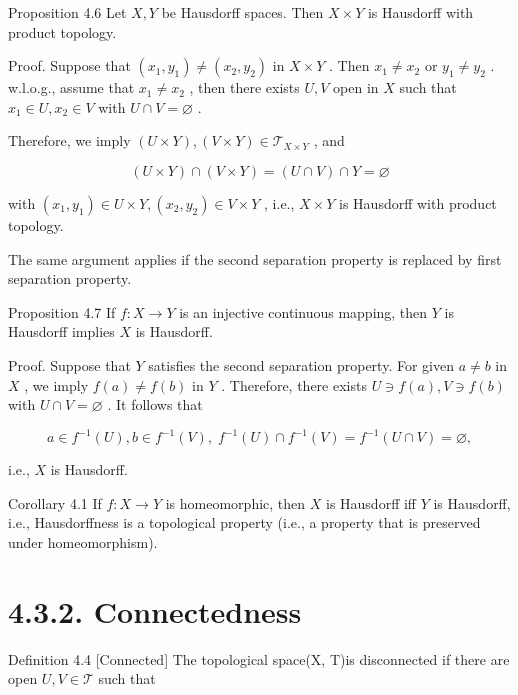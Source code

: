 Proposition 4.6 Let \(X,Y\) be Hausdorff spaces. Then \(X \times  Y\) is Hausdorff with product topology.

Proof. Suppose that \(\left( {{x}_{1},{y}_{1}}\right)  \neq  \left( {{x}_{2},{y}_{2}}\right)\) in \(X \times  Y\) . Then \({x}_{1} \neq  {x}_{2}\) or \({y}_{1} \neq  {y}_{2}\) . w.l.o.g., assume that \({x}_{1} \neq  {x}_{2}\) , then there exists \(U,V\) open in \(X\) such that \({x}_{1} \in  U,{x}_{2} \in  V\) with \(U \cap  V = \varnothing\) .

Therefore, we imply \(\left( {U \times  Y}\right) ,\left( {V \times  Y}\right)  \in  {\mathcal{T}}_{X \times  Y}\) , and

\[
\left( {U \times  Y}\right)  \cap  \left( {V \times  Y}\right)  = \left( {U \cap  V}\right)  \cap  Y = \varnothing
\]

with \(\left( {{x}_{1},{y}_{1}}\right)  \in  U \times  Y,\left( {{x}_{2},{y}_{2}}\right)  \in  V \times  Y\) , i.e., \(X \times  Y\) is Hausdorff with product topology.

The same argument applies if the second separation property is replaced by first separation property.

Proposition 4.7 If \(f : X \rightarrow  Y\) is an injective continuous mapping, then \(Y\) is Hausdorff implies \(X\) is Hausdorff.

Proof. Suppose that \(Y\) satisfies the second separation property. For given \(a \neq  b\) in \(X\) , we imply \(f\left( a\right)  \neq  f\left( b\right)\) in \(Y\) . Therefore, there exists \(U \ni  f\left( a\right) ,V \ni  f\left( b\right)\) with \(U \cap  V = \varnothing\) . It follows that

\[
a \in  {f}^{-1}\left( U\right) ,b \in  {f}^{-1}\left( V\right) ,\;{f}^{-1}\left( U\right)  \cap  {f}^{-1}\left( V\right)  = {f}^{-1}\left( {U \cap  V}\right)  = \varnothing ,
\]

i.e., \(X\) is Hausdorff.

Corollary 4.1 If \(f : X \rightarrow  Y\) is homeomorphic, then \(X\) is Hausdorff iff \(Y\) is Hausdorff, i.e., Hausdorffness is a topological property (i.e., a property that is preserved under homeomorphism).

\section*{4.3.2. Connectedness}

Definition 4.4 [Connected] The topological space(X, T)is disconnected if there are open \(U,V \in  \mathcal{T}\) such that

